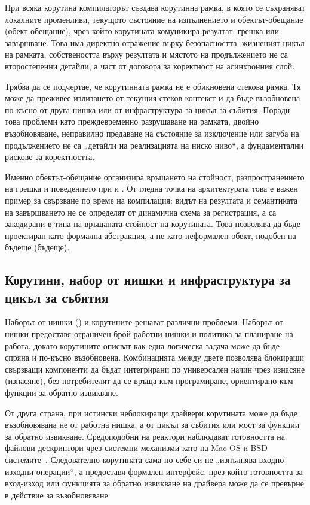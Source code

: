 При всяка корутина компилаторът създава корутинна рамка, в която се съхраняват локалните променливи, текущото състояние на изпълнението и обектът-обещание (обект-обещание), чрез който корутината комуникира резултат, грешка или завършване. Това има директно отражение върху безопасността: жизненият цикъл на рамката, собствеността върху резултата и мястото на продължението не са второстепенни детайли, а част от договора за коректност на асинхронния слой.

Трябва да се подчертае, че корутинната рамка не е обикновена стекова рамка. Тя може да преживее излизането от текущия стеков контекст и да бъде възобновена по-късно от друга нишка или от инфраструктура за цикъл за събития. Поради това проблеми като преждевременно разрушаване на рамката, двойно възобновяване, неправилно предаване на състояние за изключение или загуба на продължението не са „детайли на реализацията на ниско ниво“, а фундаментални рискове за коректността.

Именно обектът-обещание организира връщането на стойност, разпространението на грешка и поведението при  и . От гледна точка на архитектурата това е важен пример за свързване по време на компилация: видът на резултата и семантиката на завършването не се определят от динамична схема за регистрация, а са закодирани в типа на връщаната стойност на корутината. Това позволява  да бъде проектиран като формална абстракция, а не като неформален обект, подобен на бъдеще (бъдеще).

\subsection{Корутини, набор от нишки и инфраструктура за цикъл за събития}

Наборът от нишки () и корутините решават различни проблеми. Наборът от нишки предоставя ограничен брой работни нишки и политика за планиране на работа, докато корутините описват как една логическа задача може да бъде спряна и по-късно възобновена. Комбинацията между двете позволява блокиращи свързващи компоненти да бъдат интегрирани по универсален начин чрез изнасяне (изнасяне), без потребителят да се връща към програмиране, ориентирано към функции за обратно извикване.

От друга страна, при истински неблокиращи драйвери корутината може да бъде възобновявана не от работна нишка, а от цикъл за събития или мост за функции за обратно извикване. Средоподобни на реактори наблюдават готовността на файлови дескриптори чрез системни механизми като  на Mac OS и BSD системите~\cite{kqueue_man}. Следователно корутината сама по себе си не „изпълнява входно-изходни операции“, а предоставя формален интерфейс, през който готовността за вход-изход или функцията за обратно извикване на драйвера може да се превърне в действие за възобновяване.

